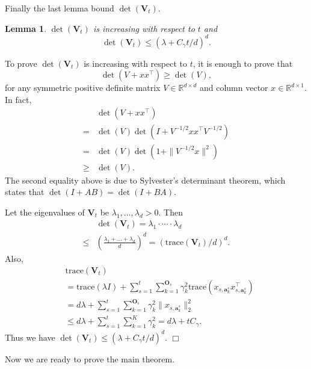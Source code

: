 \documentclass{article}
\newcommand{\RR}{\mathbb{R}}
\newcommand{\ba}{\mathbf{a}}
\newcommand{\bO}{\mathbf{O}}
\newcommand{\bV}{\mathbf{V}}
\newcommand{\trace}{\mathrm{trace}}
\newcommand{\norm}[1]{\| #1 \|}
\newtheorem{lemma}[theorem]{Lemma}%
\newenvironment{proof}{\noindent {\textbf{Proof. }}}{$\Box$ \medskip}
\begin{document}
Finally the last lemma bound $\det(\bV_t)$.

\begin{lemma} %
\label{lem:detVt}
$\det(\bV_t)$ is increasing with respect to $t$ and 
$$
\det(\bV_t) \leq (\lambda + C_\gamma t/d)^d.
$$
\end{lemma}
\begin{proof}
To prove $\det(\bV_t)$ is increasing with respect to $t$, it is enough to prove that
$$
\det(V + xx^{\top}) \geq \det(V),
$$
for any symmetric positive definite matrix $V \in \RR^{d \times d}$ and column vector $x \in \RR^{d\times 1}$. In fact,
\begin{align*}
&\det(V + xx^{\top}) \\
=& \det(V) \det(I + V^{-1/2}x x^{\top} V^{-1/2})\\
=& \det(V) \det(1 + \norm{V^{-1/2}x}^2)\\
\geq &\det(V).
\end{align*}
The second equality above is due to Sylvester's determinant theorem, which states that $\det(I + AB) = \det(I +BA)$.

Let the eigenvalues of $\bV_t$ be $\lambda_1, \ldots, \lambda_d > 0$. Then
\begin{align*}
&\det(\bV_t) = \lambda_1 \cdot \cdots \cdot \lambda_d \\
\leq & \left( \frac{\lambda_1 + \ldots + \lambda_d}{d} \right)^d = (\trace(\bV_t)/d)^d.
\end{align*}
Also,
\begin{align*}
&\trace(\bV_t)\\
& = \trace(\lambda I) + \sum_{s=1}^t \sum_{k=1}^{\bO_s} \gamma_k^2 \trace(x_{s,\ba_k^s} x_{s,\ba_k^s}^{\top})\\	
& = d \lambda + \sum_{s=1}^t \sum_{k=1}^{\bO_s} \gamma_k^2 \norm{x_{s,\ba_k^s}}_2^2\\
& \leq d \lambda + \sum_{s=1}^t\sum_{k=1}^{K}\gamma_k^2 = d \lambda + t C_\gamma.
\end{align*}
Thus we have $\det(\bV_t) \leq (\lambda + C_\gamma t/d)^d.$
\end{proof}

Now we are ready to prove the main theorem.
\end{document}
